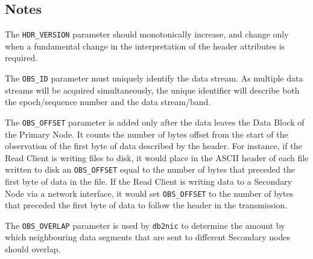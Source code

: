 \subsection{Notes}

The {\tt HDR\_VERSION} parameter should monotonically increase, and
change only when a fundamental change in the interpretation of the
header attributes is required.

The {\tt OBS\_ID} parameter must uniquely identify the data stream.
As multiple data streams will be acquired simultaneously, the unique
identifier will describe both the epoch/sequence number and the data
stream/band.

The {\tt OBS\_OFFSET} parameter is added only after the data leaves
the Data Block of the Primary Node.  It counts the number of bytes
offset from the start of the observation of the first byte of data
described by the header.  For instance, if the Read Client is writing
files to disk, it would place in the ASCII header of each file written
to disk an {\tt OBS\_OFFSET} equal to the number of bytes that
preceded the first byte of data in the file.  If the Read Client is
writing data to a Secondary Node via a network interface, it would set
{\tt OBS\_OFFSET} to the number of bytes that preceded the first byte
of data to follow the header in the transmission.

The {\tt OBS\_OVERLAP} parameter is used by {\tt db2nic} to determine
the amount by which neighbouring data segments that are sent to
different Secondary nodes should overlap.


